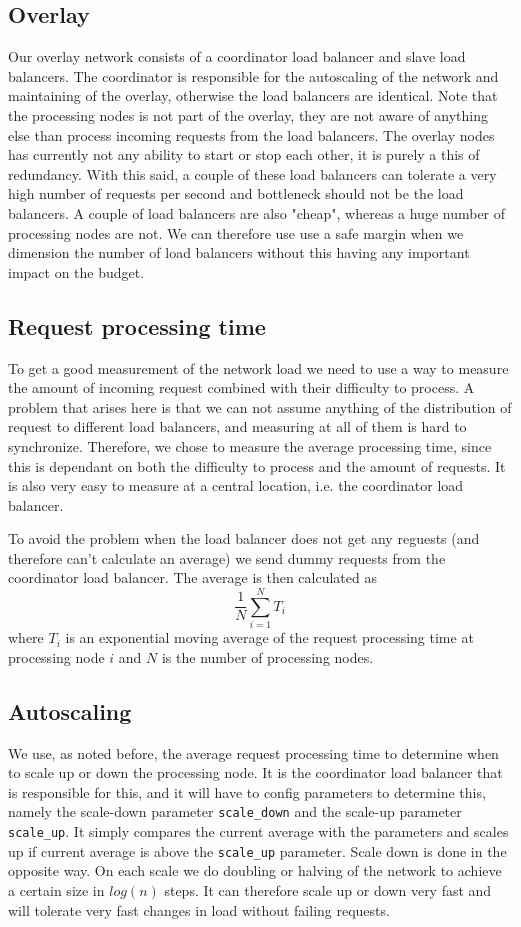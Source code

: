 \documentclass[paper=a4, fontsize=11pt]{scrartcl} %
\numberwithin{equation}{section} %
\numberwithin{figure}{section} %
\numberwithin{table}{section} %
\begin{document}
\subsection{Overlay}
Our overlay network consists of a coordinator load balancer and slave load balancers. The coordinator is responsible for the autoscaling of the network and maintaining of the overlay, otherwise the load balancers are identical. Note that the processing nodes is not part of the overlay, they are not aware of anything else than process incoming requests from the load balancers. The overlay nodes has currently not any ability to start or stop each other, it is purely a this of redundancy. With this said, a couple of these load balancers can tolerate a very high number of requests per second and bottleneck should not be the load balancers. A couple of load balancers are also "cheap", whereas a huge number of processing nodes are not. We can therefore use use a safe margin when we dimension the number of load balancers without this having any important impact on the budget.

\subsection{Request processing time}
To get a good measurement of the network load we need to use a way to measure the amount of incoming request combined with their difficulty to process. A problem that arises here is that we can not assume anything of the distribution of request to different load balancers, and measuring at all of them is hard to synchronize. Therefore, we chose to measure the average processing time, since this is dependant on both the difficulty to process and the amount of requests. It is also very easy to measure at a central location, i.e. the coordinator load balancer. 

To avoid the problem when the load balancer does not get any reguests (and therefore can't calculate an average) we send dummy requests from the coordinator load balancer. The average is then calculated as
$$\frac{1}{N}\sum^N_{i=1} T_i$$
where $T_i$ is an exponential moving average of the request processing time at processing node $i$ and $N$ is the number of processing nodes.
\subsection{Autoscaling}
We use, as noted before, the average request processing time to determine when to scale up or down the processing node. It is the coordinator load balancer that is responsible for this, and it will have to config parameters to determine this, namely the scale-down parameter \verb|scale_down| and the scale-up parameter \verb|scale_up|. It simply compares the current average with the parameters and scales up if current average is above the \verb|scale_up| parameter. Scale down is done in the opposite way. On each scale we do doubling or halving of the network to achieve a certain size in $log(n)$ steps. It can therefore scale up or down very fast and will tolerate very fast changes in load without failing requests.
\end{document}
